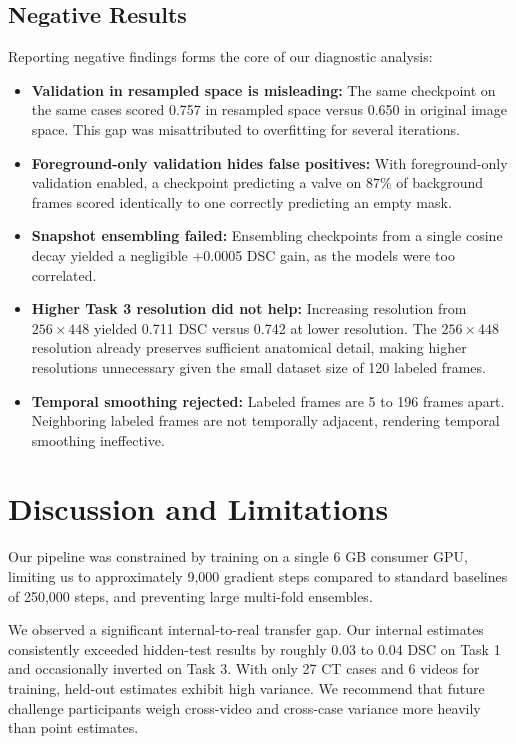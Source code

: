 \documentclass[runningheads]{llncs}
\begin{document}
\subsection{Negative Results}

Reporting negative findings forms the core of our diagnostic analysis:
\begin{itemize}
    \item \textbf{Validation in resampled space is misleading:} The same checkpoint on the same cases scored 0.757 in resampled space versus 0.650 in original image space. This gap was misattributed to overfitting for several iterations.
    \item \textbf{Foreground-only validation hides false positives:} With foreground-only validation enabled, a checkpoint predicting a valve on 87\% of background frames scored identically to one correctly predicting an empty mask.
    \item \textbf{Snapshot ensembling failed:} Ensembling checkpoints from a single cosine decay yielded a negligible +0.0005 DSC gain, as the models were too correlated. 
    \item \textbf{Higher Task 3 resolution did not help:} Increasing resolution from $256 \times 448$ yielded 0.711 DSC versus 0.742 at lower resolution. The $256 \times 448$ resolution already preserves sufficient anatomical detail, making higher resolutions unnecessary given the small dataset size of 120 labeled frames.
    \item \textbf{Temporal smoothing rejected:} Labeled frames are 5 to 196 frames apart. Neighboring labeled frames are not temporally adjacent, rendering temporal smoothing ineffective.
\end{itemize}

\section{Discussion and Limitations}

Our pipeline was constrained by training on a single 6 GB consumer GPU, limiting us to approximately 9,000 gradient steps compared to standard baselines of 250,000 steps, and preventing large multi-fold ensembles. 

We observed a significant internal-to-real transfer gap. Our internal estimates consistently exceeded hidden-test results by roughly 0.03 to 0.04 DSC on Task 1 and occasionally inverted on Task 3. With only 27 CT cases and 6 videos for training, held-out estimates exhibit high variance. We recommend that future challenge participants weigh cross-video and cross-case variance more heavily than point estimates.
\end{document}
